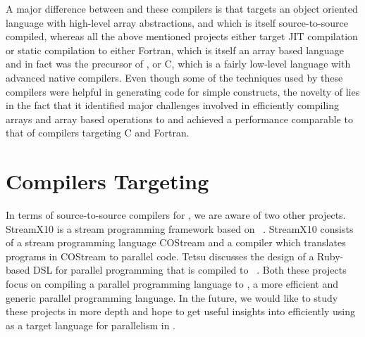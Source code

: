 A major difference between \mixten and these compilers is that \mixten targets
an object oriented language with high-level array abstractions, and which is 
itself source-to-source compiled, whereas all the above mentioned projects either target
 JIT compilation or static compilation to either Fortran, which is itself an array
based language and in fact was the precursor of \matlab, or C, which is a fairly
low-level language with advanced native compilers. 
Even though some of the techniques used by
these compilers were helpful in generating \xten code for simple \matlab constructs,
the novelty of \mixten lies in the fact that it identified major challenges
involved in efficiently compiling \matlab arrays and array based operations to 
\xten and achieved a performance comparable to that of compilers targeting 
C and Fortran.      

\section{Compilers Targeting \xten} In terms of source-to-source compilers for
\xten, we are aware of two other projects.  StreamX10 is a stream programming
framework based on \xten~\cite{Wei-2012}.  StreamX10  consists of a stream
programming language COStream and a compiler which translates programs in
COStream to parallel \xten code.  Tetsu discusses the design of a Ruby-based DSL
for parallel programming that is compiled to \xten~\cite{Tetsu-2011}. Both these
projects focus on compiling a parallel programming language to \xten, a more
efficient and generic parallel programming language. In the future, we would like to study
these projects in more depth and hope to get useful insights into efficiently
using \xten as a target language for parallelism in \matlab.
 
